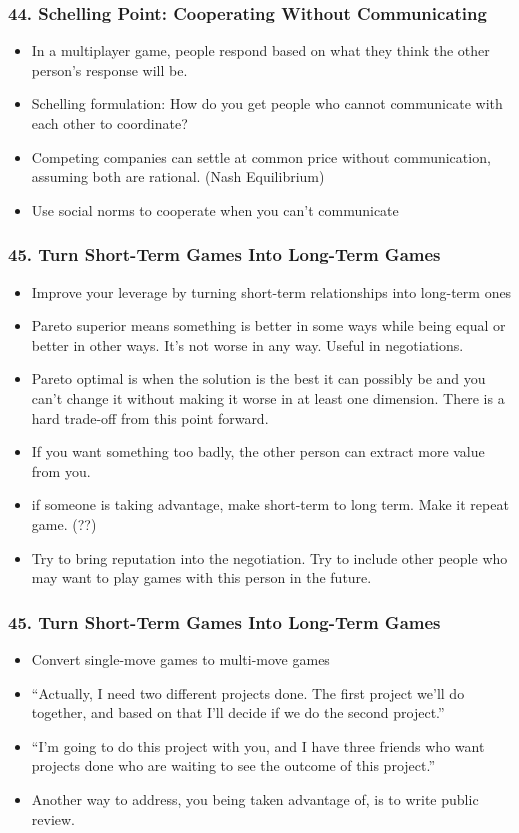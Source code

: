 \begin{frame}[fragile]
\frametitle{44. Schelling Point: Cooperating Without Communicating}
\begin{itemize}
\item In a multiplayer game, people respond based on what they think the other person’s response will be.
\item Schelling formulation: How do you get people who cannot communicate with each other to coordinate?
\item Competing companies can settle at common price without communication, assuming both are rational. (Nash Equilibrium)
\item Use social norms to cooperate when you can’t communicate
\end{itemize}
\end{frame}

\begin{frame}[fragile]
\frametitle{45. Turn Short-Term Games Into Long-Term Games}
\begin{itemize}
\item Improve your leverage by turning short-term relationships into long-term ones
\item Pareto superior means something is better in some ways while being equal or better in other ways. It’s
not worse in any way. Useful in negotiations.
\item Pareto optimal is when the solution is the best it can possibly be and you can’t change it without making
it worse in at least one dimension. There is a hard trade-off from this point forward.
\item If you want something too badly, the other person can extract more value from you.
\item if someone is taking advantage, make short-term to long term. Make it repeat game. (??)
\item  Try to bring reputation into the negotiation.
Try to include other people who may want to play games with this person in the future.
\end{itemize}
\end{frame}

\begin{frame}[fragile]
\frametitle{45. Turn Short-Term Games Into Long-Term Games}
\begin{itemize}
\item Convert single-move games to multi-move games
\item  “Actually, I need two different projects done. The  first project we’ll do
together, and based on that I’ll decide if we do the second project.”
\item  “I’m going to do this project with you, and I have three friends who want projects
done who are waiting to see the outcome of this project.”
\item Another way to address, you being taken advantage of, is to write public review.
\end{itemize}
\end{frame}


